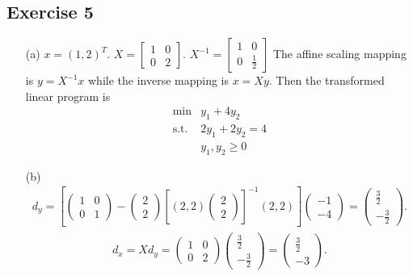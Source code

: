\documentclass[11pt]{article}
\begin{document}
\subsection*{Exercise 5}
\begin{itemize}
	\item[(a)] $x=(1,2)^T$. $X=\begin{bmatrix}1 & 0 \\ 0 & 2\end{bmatrix}$. $X^{-1}=\begin{bmatrix}1 & 0 \\ 0 &  \frac{1}{2} \end{bmatrix}$ The affine scaling mapping is $y=X^{-1}x$ while the inverse mapping is $x=Xy$. Then the transformed linear program is
	\begin{equation*}
	\begin{array}{rl}
	\min & y_1+4y_2 \\
	\text{s.t.} & 2y_1 + 2y_2 = 4 \\
	& y_1,y_2 \geq 0
	\end{array}
	\end{equation*}
	\item[(b)] 
	\begin{align*}
	d_y=\left[  \left( \begin{array}{ll} 1& 0 \\ 0 & 1 \end{array}\right) - \left( \begin{array}{l} 2 \\ 2 \end{array}\right)\left[ (2, 2)\left( \begin{array}{l} 2 \\ 2 \end{array}\right)\right] ^{-1}(2, 2)\right]  \left( \begin{array}{c} -1 \\ -4 \end{array}\right)=\left( \begin{array}{c} \frac{3}{2} \\ -\frac{3}{2} \end{array}\right).
	\end{align*}
	\begin{align*}
	d_x=Xd_y=\left( \begin{array}{ll} 1& 0 \\ 0 & 2 \end{array}\right)\left( \begin{array}{c} \frac{3}{2} \\ -\frac{3}{2} \end{array}\right)=\left( \begin{array}{c} \frac{3}{2} \\ -3 \end{array}\right).
	\end{align*}
	

\end{itemize}
\end{document}
